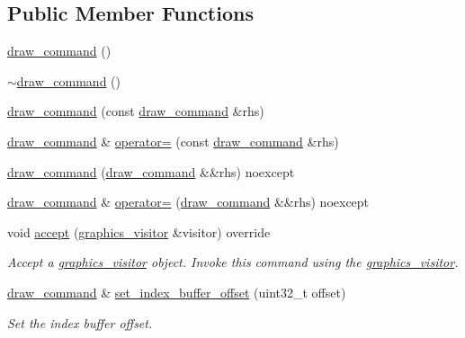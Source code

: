 \subsection*{Public Member Functions}
\begin{DoxyCompactItemize}
\item 
\mbox{\hyperlink{classmoka_1_1draw__command_afb4e5a94e4559a1a0b75d39a36dbce07}{draw\+\_\+command}} ()
\item 
\mbox{\hyperlink{classmoka_1_1draw__command_a54a3f000bcdef7216b8c1297c79030d2}{$\sim$draw\+\_\+command}} ()
\item 
\mbox{\hyperlink{classmoka_1_1draw__command_ad1861f72a58e7459b1873b6b94169374}{draw\+\_\+command}} (const \mbox{\hyperlink{classmoka_1_1draw__command}{draw\+\_\+command}} \&rhs)
\item 
\mbox{\hyperlink{classmoka_1_1draw__command}{draw\+\_\+command}} \& \mbox{\hyperlink{classmoka_1_1draw__command_af468f0d21fdd5b28d5ee583dfccdc737}{operator=}} (const \mbox{\hyperlink{classmoka_1_1draw__command}{draw\+\_\+command}} \&rhs)
\item 
\mbox{\hyperlink{classmoka_1_1draw__command_ad52678c738121e05bfa122b4736f4f24}{draw\+\_\+command}} (\mbox{\hyperlink{classmoka_1_1draw__command}{draw\+\_\+command}} \&\&rhs) noexcept
\item 
\mbox{\hyperlink{classmoka_1_1draw__command}{draw\+\_\+command}} \& \mbox{\hyperlink{classmoka_1_1draw__command_ac0bc4736f13b8a2d378151399d7fa9ea}{operator=}} (\mbox{\hyperlink{classmoka_1_1draw__command}{draw\+\_\+command}} \&\&rhs) noexcept
\item 
void \mbox{\hyperlink{classmoka_1_1draw__command_a5182c69d730f0a34185e190b4e1ecf54}{accept}} (\mbox{\hyperlink{classmoka_1_1graphics__visitor}{graphics\+\_\+visitor}} \&visitor) override
\begin{DoxyCompactList}\small\item\em Accept a \mbox{\hyperlink{classmoka_1_1graphics__visitor}{graphics\+\_\+visitor}} object. Invoke this command using the \mbox{\hyperlink{classmoka_1_1graphics__visitor}{graphics\+\_\+visitor}}. \end{DoxyCompactList}\item 
\mbox{\hyperlink{classmoka_1_1draw__command}{draw\+\_\+command}} \& \mbox{\hyperlink{classmoka_1_1draw__command_aba3925099a593478027634f65177ecea}{set\+\_\+index\+\_\+buffer\+\_\+offset}} (uint32\+\_\+t offset)
\begin{DoxyCompactList}\small\item\em Set the index buffer offset. \end{DoxyCompactList}\item 

\end{DoxyCompactItemize}
